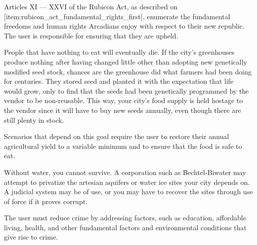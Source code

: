 
Articles XI --- XXVI of the Rubicon Act, as described on [item:rubicon_act_fundamental_rights_first], enumerate the fundamental freedoms and human rights Arcadians enjoy with respect to their new republic. The user is responsible for ensuring that they are upheld.


People that have nothing to eat will eventually die. If the city's greenhouses produce nothing after having changed little other than adopting new genetically modified seed stock, chances are the greenhouse did what farmers had been doing for centuries. They stored seed and planted it with the expectation that life would grow, only to find that the seeds had been genetically programmed by the vendor to be non-reusable. This way, your city's food supply is held hostage to the vendor since it will have to buy new seeds annually, even though there are still plenty in stock.

Scenarios that depend on this goal require the user to restore their annual agricultural yield to a variable minimum and to ensure that the food is safe to eat.


Without water, you cannot survive. A corporation such as Bechtel-Biwater may attempt to privatize the artesian aquifers or water ice sites your city depends on. A judicial system may be of use, or you may have to recover the sites through use of force if it proves corrupt.


The user must reduce crime by addressing factors, such as education, affordable living, health, and other fundamental factors and environmental conditions that give rise to crime.

\stopitemize

